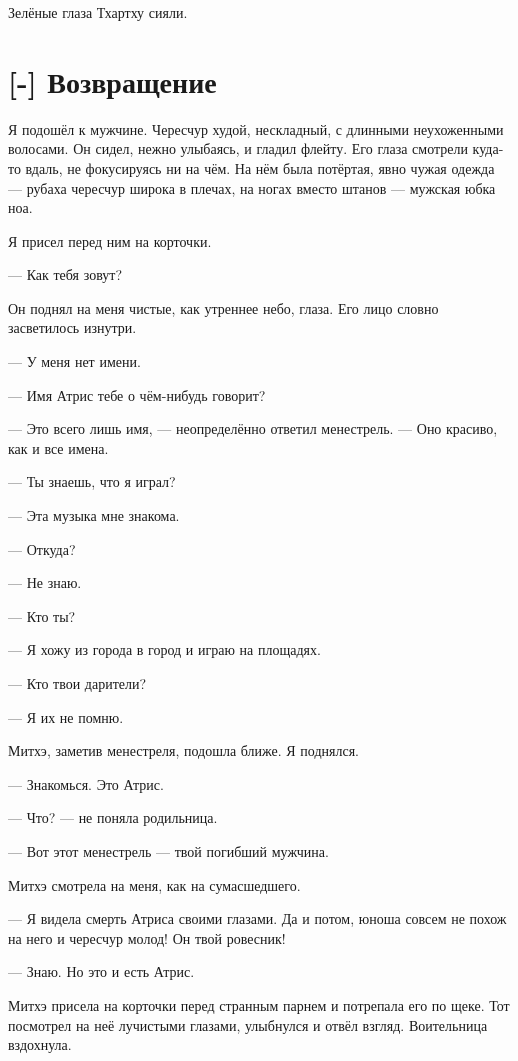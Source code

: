 Зелёные глаза Тхартху сияли.

\section{[-] Возвращение}

\textspace

Я подошёл к мужчине.
Чересчур худой, нескладный, с длинными неухоженными волосами.
Он сидел, нежно улыбаясь, и гладил флейту.
Его глаза смотрели куда-то вдаль, не фокусируясь ни на чём.
На нём была потёртая, явно чужая одежда --- рубаха чересчур широка в плечах, на ногах вместо штанов --- мужская юбка ноа.

Я присел перед ним на корточки.

--- Как тебя зовут?

Он поднял на меня чистые, как утреннее небо, глаза.
Его лицо словно засветилось изнутри.

--- У меня нет имени.

--- Имя Атрис тебе о чём-нибудь говорит?

--- Это всего лишь имя, --- неопределённо ответил менестрель.
--- Оно красиво, как и все имена.

--- Ты знаешь, что я играл?

--- Эта музыка мне знакома.

--- Откуда?

--- Не знаю.

--- Кто ты?

--- Я хожу из города в город и играю на площадях.

--- Кто твои дарители?

--- Я их не помню.

Митхэ, заметив менестреля, подошла ближе.
Я поднялся.

--- Знакомься.
Это Атрис.

--- Что? --- не поняла родильница.

--- Вот этот менестрель --- твой погибший мужчина.

Митхэ смотрела на меня, как на сумасшедшего.

--- Я видела смерть Атриса своими глазами.
Да и потом, юноша совсем не похож на него и чересчур молод!
Он твой ровесник!

--- Знаю.
Но это и есть Атрис.

Митхэ присела на корточки перед странным парнем и потрепала его по щеке.
Тот посмотрел на неё лучистыми глазами, улыбнулся и отвёл взгляд.
Воительница вздохнула.

